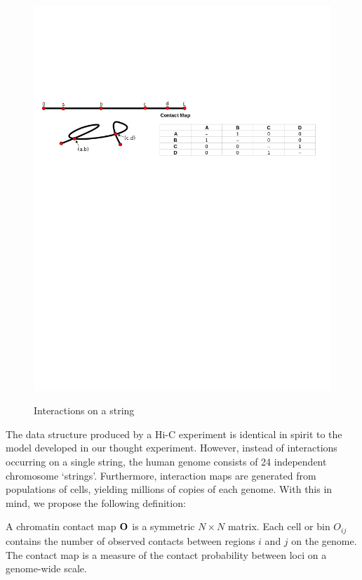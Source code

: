 \begin{figure}[b]
  \centering
  \caption{Interactions on a string}
  \includegraphics{figures/mathematics/strmtx}\label{fig:string}
\end{figure}

The data structure produced by a Hi-C experiment is identical in spirit to the model developed in our thought experiment.  However, instead of
interactions occurring on a single string, the human genome consists of 24 independent chromosome `strings'.  Furthermore, interaction maps are
generated from populations of cells, yielding millions of copies of each genome.  With this in mind, we propose the following definition:

\begin{defn}
  A chromatin contact map $\mathbf{O}$ is a symmetric $N \times N$ matrix.  Each cell or bin $O_{ij}$ contains the number of observed contacts
  between regions $i$ and $j$ on the genome.  The contact map is a measure of the contact probability between loci on a genome-wide scale.
\end{defn}

